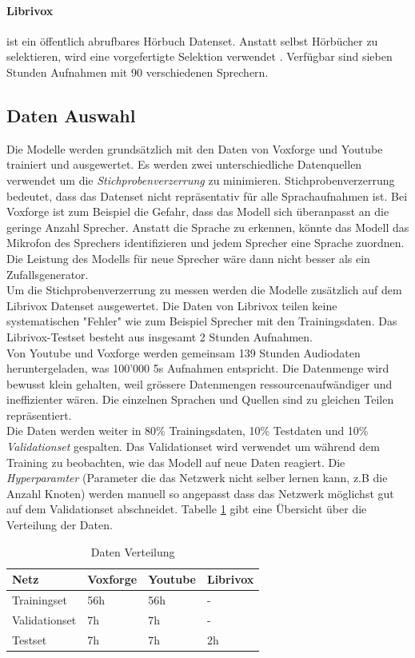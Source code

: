 \paragraph{Librivox} ist ein öffentlich abrufbares Hörbuch Datenset. Anstatt selbst Hörbücher zu selektieren, wird eine vorgefertigte Selektion verwendet \cite{librivox-compilation}. Verfügbar sind sieben Stunden Aufnahmen mit 90 verschiedenen Sprechern.


\subsection{Daten Auswahl}
Die Modelle werden grundsätzlich mit den Daten von Voxforge und Youtube trainiert und ausgewertet. Es werden zwei unterschiedliche Datenquellen verwendet um die \textit{Stichprobenverzerrung} zu minimieren. Stichprobenverzerrung bedeutet, dass das Datenset nicht repräsentativ für alle Sprachaufnahmen ist. Bei Voxforge ist zum Beispiel die Gefahr, dass das Modell sich überanpasst an die geringe Anzahl Sprecher. Anstatt die Sprache zu erkennen, könnte das Modell das Mikrofon des Sprechers identifizieren und jedem Sprecher eine Sprache zuordnen. Die Leistung des Modells für neue Sprecher wäre dann nicht besser als ein Zufallsgenerator.
\\
Um die Stichprobenverzerrung zu messen werden die Modelle zusätzlich auf dem Librivox Datenset ausgewertet. Die Daten von Librivox teilen keine systematischen "Fehler" wie zum Beispiel Sprecher mit den Trainingsdaten. Das Librivox-Testset besteht aus insgesamt 2 Stunden Aufnahmen.
\\
Von Youtube und Voxforge werden gemeinsam 139 Stunden Audiodaten heruntergeladen, was 100'000 5s Aufnahmen entspricht. Die Datenmenge wird bewusst klein gehalten, weil grössere Datenmengen ressourcenaufwändiger und ineffizienter wären. Die einzelnen Sprachen und Quellen sind zu gleichen Teilen repräsentiert. 
\\
Die Daten werden weiter in 80\% Trainingsdaten, 10\% Testdaten und 10\% \textit{Validationset} gespalten. Das Validationset wird verwendet um während dem Training zu beobachten, wie das Modell auf neue Daten reagiert. Die \textit{Hyperparamter} (Parameter die das Netzwerk nicht selber lernen kann, z.B die Anzahl Knoten) werden manuell so angepasst dass das Netzwerk möglichst gut auf dem Validationset abschneidet. Tabelle \ref{tab:data} gibt eine Übersicht über die Verteilung der Daten.
\begin{table}[]
	\centering
	\begin{tabular}{llll}
	\hline
	Netz          & Voxforge & Youtube & Librivox \\ \hline
	Trainingset   & 56h      & 56h     & -        \\
	Validationset & 7h       & 7h      & -        \\
	Testset       & 7h       & 7h      & 2h       \\ \hline
	\end{tabular}
	\caption{Daten Verteilung}
	\label{tab:data}
\end{table}


